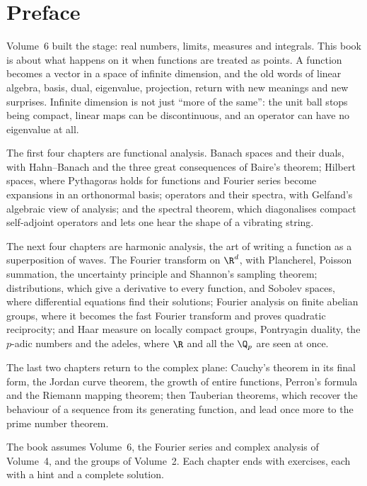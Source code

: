 \chapter*{Preface}
Volume~6 built the stage: real numbers, limits, measures and integrals. This book is about what happens on it when functions are
treated as points. A function becomes a vector in a space of infinite dimension, and the old words of linear algebra, basis,
dual, eigenvalue, projection, return with new meanings and new surprises. Infinite dimension is not just ``more of the same'':
the unit ball stops being compact, linear maps can be discontinuous, and an operator can have no eigenvalue at all.

The first four chapters are functional analysis. Banach spaces and their duals, with Hahn--Banach and the three great
consequences of Baire's theorem; Hilbert spaces, where Pythagoras holds for functions and Fourier series become expansions in an
orthonormal basis; operators and their spectra, with Gelfand's algebraic view of analysis; and the spectral theorem, which
diagonalises compact self-adjoint operators and lets one hear the shape of a vibrating string.

The next four chapters are harmonic analysis, the art of writing a function as a superposition of waves. The Fourier transform
on $\R^d$, with Plancherel, Poisson summation, the uncertainty principle and Shannon's sampling theorem; distributions, which give
a derivative to every function, and Sobolev spaces, where differential equations find their solutions; Fourier analysis on
finite abelian groups, where it becomes the fast Fourier transform and proves quadratic reciprocity; and Haar measure on locally
compact groups, Pontryagin duality, the $p$-adic numbers and the adeles, where $\R$ and all the $\Q_p$ are seen at once.

The last two chapters return to the complex plane: Cauchy's theorem in its final form, the Jordan curve theorem, the growth of
entire functions, Perron's formula and the Riemann mapping theorem; then Tauberian theorems, which recover the behaviour of a
sequence from its generating function, and lead once more to the prime number theorem.

The book assumes Volume~6, the Fourier series and complex analysis of Volume~4, and the groups of Volume~2. Each chapter ends with
exercises, each with a hint and a complete solution.
